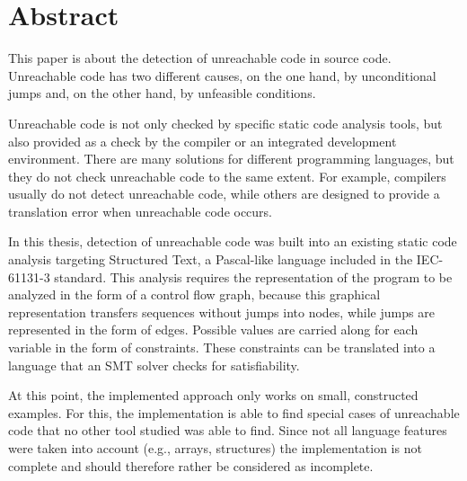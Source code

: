 \chapter{Abstract}
\label{cha:abstract}

This paper is about the detection of unreachable code in source code. 
Unreachable code has two different causes, on the one hand, by unconditional jumps and, on the other hand, by unfeasible conditions.

Unreachable code is not only checked by specific static code analysis tools, but also provided as a check by the compiler or an integrated development environment. There are many solutions for different programming languages, but they do not check unreachable code to the same extent. For example, compilers usually do not detect unreachable code, while others are designed to provide a translation error when unreachable code occurs.


In this thesis, detection of unreachable code was built into an existing static code analysis targeting Structured Text, a Pascal-like language included in the IEC-61131-3 standard. This analysis requires the representation of the program to be analyzed in the form of a control flow graph, because this graphical representation transfers sequences without jumps into nodes, while jumps are represented in the form of edges. Possible values are carried along for each variable in the form of constraints. These constraints can be translated into a language that an SMT solver checks for satisfiability. 

At this point, the implemented approach only works on small, constructed examples. For this, the implementation is able to find special cases of unreachable code that no other tool studied was able to find. Since not all language features were taken into account (e.g., arrays, structures) the implementation is not complete and should therefore rather be considered as incomplete.

